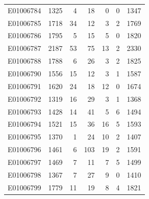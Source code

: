 \documentclass[
  letterpaper,
  DIV=11,
  numbers=noendperiod]{scrreprt}
\begin{document}
\begin{tabular}{lrrrrrr}
E01006784     &    1325 &       4 &                    18 &                               0 &                       0 &              1347 \\
E01006785     &    1718 &      34 &                    12 &                               3 &                       2 &              1769 \\
E01006786     &    1795 &       5 &                    15 &                               5 &                       0 &              1820 \\
E01006787     &    2187 &      53 &                    75 &                              13 &                       2 &              2330 \\
E01006788     &    1788 &       6 &                    26 &                               3 &                       2 &              1825 \\
E01006790     &    1556 &      15 &                    12 &                               3 &                       1 &              1587 \\
E01006791     &    1620 &      24 &                    18 &                              12 &                       0 &              1674 \\
E01006792     &    1319 &      16 &                    29 &                               3 &                       1 &              1368 \\
E01006793     &    1428 &      14 &                    41 &                               5 &                       6 &              1494 \\
E01006794     &    1521 &      15 &                    36 &                              16 &                       5 &              1593 \\
E01006795     &    1370 &       1 &                    24 &                              10 &                       2 &              1407 \\
E01006796     &    1461 &       6 &                   103 &                              19 &                       2 &              1591 \\
E01006797     &    1469 &       7 &                    11 &                               7 &                       5 &              1499 \\
E01006798     &    1367 &       7 &                    27 &                               9 &                       0 &              1410 \\
E01006799     &    1779 &      11 &                    19 &                               8 &                       4 &              1821 \\

\end{tabular}
\end{document}

